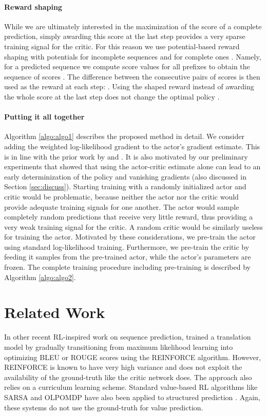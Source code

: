 \documentclass{article} \usepackage{iclr2017_conference,times}
\begin{document}
\paragraph{Reward shaping}
While we are ultimately interested in the maximization of the score of a complete
prediction, simply awarding this score at the last 
step provides a very sparse training signal for the critic. For this reason we
use potential-based reward shaping with potentials  for incomplete sequences and  for
complete ones \citep{ng1999policy}. Namely, for a predicted sequence 
we compute score values for all prefixes to obtain the sequence of scores
.  The difference between the consecutive pairs of scores is then used
as the reward at each step: . Using the shaped reward  
instead of awarding the whole score  at the last step does not change the 
optimal policy
\citep{ng1999policy}.
\paragraph{Putting it all together}

Algorithm \ref{algo:algo1} describes the proposed method in detail.
We consider adding the weighted
log-likelihood gradient to the actor's gradient estimate. This is in line with
the prior work by \citep{ranzato2015sequence} and \citep{shen2015minimum}. It is
also motivated by our preliminary experiments that showed that using the
actor-critic estimate alone can lead to an early determinization of the policy
and vanishing gradients (also discussed in Section \ref{sec:discuss}).
Starting training with a randomly initialized actor and critic would be
problematic,
 because neither the actor nor the critic would provide adequate
training signals for one another.
 The actor would sample completely random
predictions that receive very little reward,
 thus providing a very weak
training signal for the critic.
 A random critic would be similarly useless
for training the actor. Motivated by these considerations, 
 we pre-train the
actor using standard log-likelihood training. Furthermore, we
 pre-train the
critic by feeding it samples from the pre-trained actor, while the actor's
parameters are frozen. The complete training procedure including pre-training
is described by Algorithm \ref{algo:algo2}.


\section{Related Work}

In other recent RL-inspired work on sequence prediction, \citet{ranzato2015sequence}
trained a translation model 
by gradually transitioning from maximum likelihood learning into
optimizing BLEU or ROUGE scores using the REINFORCE algorithm.
However, REINFORCE is known to have very high variance
and does not exploit the availability of the ground-truth like the critic
network does. The approach also relies on a curriculum learning scheme.
Standard value-based RL algorithms like SARSA and OLPOMDP have also been applied to structured
prediction \citep{maes2009structured}. Again, these systems do not
use the ground-truth for value prediction.
\end{document}
